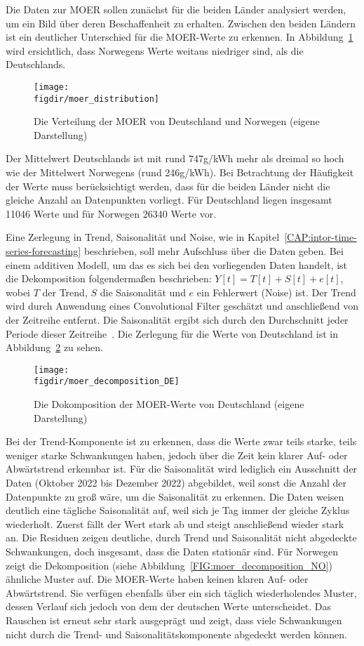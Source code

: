 Die Daten zur \ac{MOER} sollen zunächst für die beiden Länder analysiert werden, um ein Bild über deren Beschaffenheit zu erhalten.
Zwischen den beiden Ländern ist ein deutlicher Unterschied für die MOER-Werte zu erkennen.
In Abbildung~\ref{FIG:moer_distribution} wird ersichtlich, dass Norwegens Werte weitaus niedriger sind, als die Deutschlands.
\begin{figure}
 \caption[Verteilung MOER Deutschland und Norwegen]{Die Verteilung der MOER von Deutschland und Norwegen (eigene Darstellung)}
 {\texttt{[image: \\figdir/moer\_distribution]}}
 \label{FIG:moer_distribution}
\end{figure}
Der Mittelwert Deutschlands ist mit rund 747g/\ac{kWh} mehr als dreimal so hoch wie der Mittelwert Norwegens (rund 246g/\ac{kWh}).
Bei Betrachtung der Häufigkeit der Werte muss berücksichtigt werden, dass für die beiden Länder nicht die gleiche Anzahl an Datenpunkten vorliegt.
Für Deutschland liegen insgesamt 11046 Werte und für Norwegen 26340 Werte vor.

Eine Zerlegung in Trend, Saisonalität und Noise, wie in Kapitel~\ref{CAP:intor-time-series-forecasting} beschrieben, soll mehr Aufschluss über die Daten geben.
Bei einem additiven Modell, um das es sich bei den vorliegenden Daten handelt, ist die Dekomposition folgendermaßen beschrieben:
$Y[t] = T[t] + S[t] + e[t]$, wobei $T$ der Trend, $S$ die Saisonalität und $e$ ein Fehlerwert (Noise) ist.
Der Trend wird durch Anwendung eines Convolutional Filter geschätzt und anschließend von der Zeitreihe entfernt.
Die Saisonalität ergibt sich durch den Durchschnitt jeder Periode dieser Zeitreihe~\cite{JosefPerktold.2023}.
Die Zerlegung für die Werte von Deutschland ist in Abbildung~\ref{FIG:moer_decomposition_DE} zu sehen.
\begin{figure}
 \caption[Dekomposition der MOER Deutschlands]{Die Dokomposition der MOER-Werte von Deutschland (eigene Darstellung)}
 {\texttt{[image: \\figdir/moer\_decomposition\_DE]}}
 \label{FIG:moer_decomposition_DE}
\end{figure}
Bei der Trend-Komponente ist zu erkennen, dass die Werte zwar teils starke, teils weniger starke Schwankungen haben, jedoch über die Zeit kein klarer Auf- oder Abwärtstrend erkennbar ist.
Für die Saisonalität wird lediglich ein Ausschnitt der Daten (Oktober 2022 bis Dezember 2022) abgebildet, weil sonst die Anzahl der Datenpunkte zu groß wäre, um die Saisonalität zu erkennen.
Die Daten weisen deutlich eine tägliche Saisonalität auf, weil sich je Tag immer der gleiche Zyklus wiederholt.
Zuerst fällt der Wert stark ab und steigt anschließend wieder stark an.
Die Residuen zeigen deutliche, durch Trend und Saisonalität nicht abgedeckte Schwankungen, doch insgesamt, dass die Daten stationär sind.
Für Norwegen zeigt die Dekomposition (siehe Abbildung~\ref{FIG:moer_decomposition_NO}) ähnliche Muster auf.
Die \ac{MOER}-Werte haben keinen klaren Auf- oder Abwärtstrend.
Sie verfügen ebenfalls über ein sich täglich wiederholendes Muster, dessen Verlauf sich jedoch von dem der deutschen Werte unterscheidet.
Das Rauschen ist erneut sehr stark ausgeprägt und zeigt, dass viele Schwankungen nicht durch die Trend- und Saisonalitätskomponente abgedeckt werden können.

